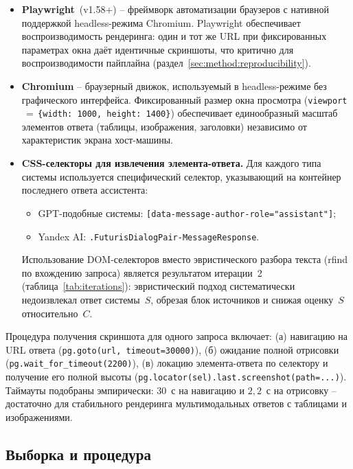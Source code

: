 \begin{itemize}
    \item \textbf{Playwright}~(v1.58+) -- фреймворк автоматизации
        браузеров с нативной поддержкой headless-режима Chromium.
        Playwright обеспечивает воспроизводимость рендеринга: один и
        тот же URL при фиксированных параметрах окна даёт
        идентичные скриншоты, что критично для воспроизводимости
        пайплайна (раздел~\ref{sec:method:reproducibility}).
    \item \textbf{Chromium} -- браузерный движок, используемый в
        headless-режиме без графического интерфейса.
        Фиксированный размер окна просмотра
        (\texttt{viewport$\,=\,$\{width: 1000, height: 1400\}})
        обеспечивает единообразный масштаб элементов ответа
        (таблицы, изображения, заголовки) независимо от
        характеристик экрана хост-машины.
    \item \textbf{CSS-селекторы для извлечения элемента-ответа.}
        Для каждого типа системы используется специфический селектор,
        указывающий на контейнер последнего ответа ассистента:
        \begin{itemize}
            \item GPT-подобные системы:
                \texttt{[data-message-author-role="assistant"]};
            \item Yandex AI:
                \texttt{.FuturisDialogPair-MessageResponse}.
        \end{itemize}
        Использование DOM-селекторов вместо эвристического разбора
        текста (rfind по вхождению запроса) является результатом
        итерации~2 (таблица~\ref{tab:iterations}): эвристический
        подход систематически недоизвлекал ответ системы~$S$,
        обрезая блок источников и снижая оценку~$S$ относительно~$C$.
\end{itemize}

Процедура получения скриншота для одного запроса включает:
(а) навигацию на URL ответа (\texttt{pg.goto(url, timeout=30000)}),
(б) ожидание полной отрисовки (\texttt{pg.wait\_for\_timeout(2200)}),
(в) локацию элемента-ответа по селектору и получение его полной
высоты (\texttt{pg.locator(sel).last.screenshot(path=...)}).
Таймауты подобраны эмпирически: $30$~с на навигацию и $2{,}2$~с
на отрисовку -- достаточно для стабильного рендеринга
мультимодальных ответов с таблицами и изображениями.

\subsection{Выборка и процедура}


